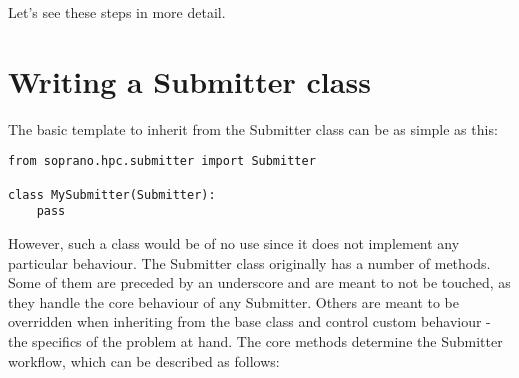 \documentclass[]{report}
\begin{document}
Let's see these steps in more detail.

\section{Writing a Submitter class}

The basic template to inherit from the Submitter class can be as simple as this:

\begin{lstlisting}
from soprano.hpc.submitter import Submitter

class MySubmitter(Submitter):
	pass
\end{lstlisting}

However, such a class would be of no use since it does not implement any particular behaviour. The Submitter class originally has a number of methods. Some of them are preceded by an underscore and are meant to not be touched, as they handle the core behaviour of any Submitter. Others are meant to be overridden when inheriting from the base class and control custom behaviour - the specifics of the problem at hand. The core methods determine the Submitter workflow, which can be described as follows:
\end{document}
